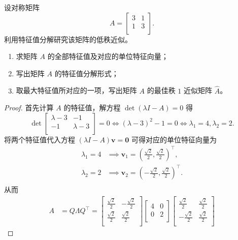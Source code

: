 设对称矩阵 \[
A = \begin{bmatrix}
    3 & 1 \\
    1 & 3 \\
\end{bmatrix}.
\]
利用特征值分解研究该矩阵的低秩近似。

\begin{enumerate}
    \item 求矩阵 $A$ 的全部特征值及对应的单位特征向量；
    \item 写出矩阵 $A$ 的特征值分解形式；
    \item 取最大特征值所对应的一项，写出矩阵 $A$ 的最佳秩 $1$ 近似矩阵 $\hat{A}$。
\end{enumerate}

\begin{proof}
首先计算 $A$ 的特征值，解方程 $\det \left(\lambda I - A\right) = 0$ 得 \[
\det\begin{bmatrix}
    \lambda - 3 & -1 \\
    -1 & \lambda - 3 \\
\end{bmatrix} = 0 \iff \left(\lambda - 3\right)^2 - 1 = 0 \iff \boxed{\lambda_1 = 4, \lambda_2 = 2}.
\]
将两个特征值代入方程 $\left(\lambda I - A\right) \boldsymbol{v} = \boldsymbol{0}$ 可得对应的单位特征向量为 \[
\begin{aligned}
    \lambda_1 = 4 &\implies \boxed{\boldsymbol{v}_1 = \left(\frac{\sqrt{2}}{2}, \frac{\sqrt{2}}{2}\right)^\top}, \\
    \lambda_2 = 2 &\implies \boxed{\boldsymbol{v}_2 = \left(-\frac{\sqrt{2}}{2}, \frac{\sqrt{2}}{2}\right)^\top}. \\
\end{aligned}
\]
从而 \[
\begin{aligned}
    A &= Q \Lambda Q^\top = \begin{bmatrix}
        \frac{\sqrt{2}}{2} & -\frac{\sqrt{2}}{2} \\
        \frac{\sqrt{2}}{2} & \frac{\sqrt{2}}{2} \\
    \end{bmatrix} \begin{bmatrix}
        4 & 0 \\
        0 & 2 \\
    \end{bmatrix} \begin{bmatrix}
        \frac{\sqrt{2}}{2} & \frac{\sqrt{2}}{2} \\
        -\frac{\sqrt{2}}{2} & \frac{\sqrt{2}}{2} \\

\end{bmatrix}
\end{aligned}\]
\end{proof}
